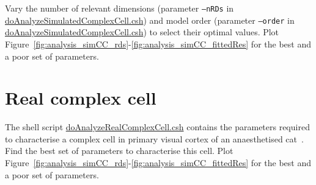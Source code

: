\documentclass[12pt]{article}
\begin{document}
Vary the number of relevant dimensions (parameter \texttt{--nRDs} in
\href{https://github.com/joacorapela/neuroinformatics24/blob/master/worksheets/06_linearRegression/code/scripts/doAnalyzeSimulatedComplexCell.csh}{doAnalyzeSimulatedComplexCell.csh})
and model order (parameter \texttt{--order} in
\href{https://github.com/joacorapela/neuroinformatics24/blob/master/worksheets/06_linearRegression/code/scripts/doAnalyzeSimulatedComplexCell.csh}{doAnalyzeSimulatedComplexCell.csh})
to select their optimal values. Plot
Figure~\ref{fig:analysis_simCC_rds}-\ref{fig:analysis_simCC_fittedRes} for the
best and a poor set of parameters.

\section{Real complex cell}

The shell script
\href{https://github.com/joacorapela/neuroinformatics24/blob/master/worksheets/06_linearRegression/code/scripts/doAnalyzeRealComplexCell.csh}{doAnalyzeRealComplexCell.csh}
contains the parameters required to characterise a complex cell in primary
visual cortex of an anaesthetised cat~\citep{felsenEtAl05}. Find the best set of
parameters to characterise this cell. Plot
Figure~\ref{fig:analysis_simCC_rds}-\ref{fig:analysis_simCC_fittedRes} for the
best and a poor set of parameters.




\end{document}
